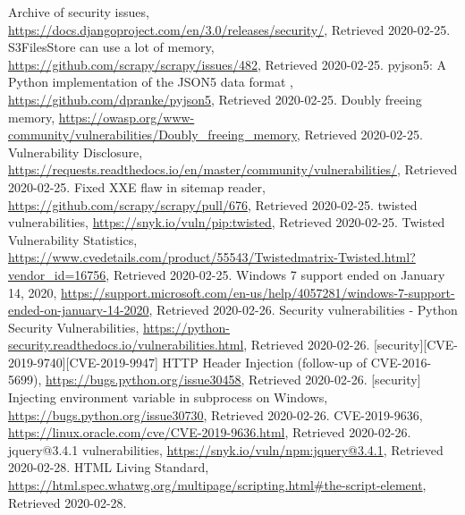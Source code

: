 \documentclass[12pt, a4paper]{article}
\newcommand{\citeWeb}[3]{#1, \url{#2}, Retrieved #3.}
\begin{document}
\begin{thebibliography}{99}
     \citeWeb{Archive of security issues}{https://docs.djangoproject.com/en/3.0/releases/security/}{2020-02-25}
     \citeWeb{S3FilesStore can use a lot of memory}{https://github.com/scrapy/scrapy/issues/482}{2020-02-25}
     \citeWeb{pyjson5: A Python implementation of the JSON5 data format
}{https://github.com/dpranke/pyjson5}{2020-02-25}
     \citeWeb{Doubly freeing memory}{https://owasp.org/www-community/vulnerabilities/Doubly_freeing_memory}{2020-02-25}
     \citeWeb{Vulnerability Disclosure}{https://requests.readthedocs.io/en/master/community/vulnerabilities/}{2020-02-25}
     \citeWeb{Fixed XXE flaw in sitemap reader}{https://github.com/scrapy/scrapy/pull/676}{2020-02-25}
     \citeWeb{twisted vulnerabilities}{https://snyk.io/vuln/pip:twisted}{2020-02-25}
     \citeWeb{Twisted Vulnerability Statistics}{https://www.cvedetails.com/product/55543/Twistedmatrix-Twisted.html?vendor_id=16756}{2020-02-25}
     \citeWeb{Windows 7 support ended on January 14, 2020}{https://support.microsoft.com/en-us/help/4057281/windows-7-support-ended-on-january-14-2020}{2020-02-26}
     \citeWeb{Security vulnerabilities - Python Security Vulnerabilities}{https://python-security.readthedocs.io/vulnerabilities.html}{2020-02-26}
     \citeWeb{[security][CVE-2019-9740][CVE-2019-9947] HTTP Header Injection (follow-up of CVE-2016-5699)}{https://bugs.python.org/issue30458}{2020-02-26}
     \citeWeb{[security] Injecting environment variable in subprocess on Windows}{https://bugs.python.org/issue30730}{2020-02-26}
     \citeWeb{CVE-2019-9636}{https://linux.oracle.com/cve/CVE-2019-9636.html}{2020-02-26}
     \citeWeb{jquery@3.4.1 vulnerabilities}{https://snyk.io/vuln/npm:jquery@3.4.1}{2020-02-28}
     \citeWeb{HTML
Living Standard}{https://html.spec.whatwg.org/multipage/scripting.html\#the-script-element}{2020-02-28}
\end{thebibliography}

% 
\end{document}
